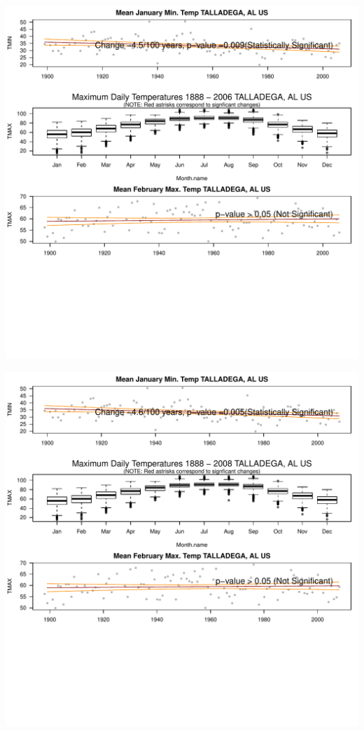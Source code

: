 \documentclass{article}\usepackage[]{graphicx}\usepackage[]{color}
\makeatletter
\def\maxwidth{ %
  \ifdim\Gin@nat@width>\linewidth
    \linewidth
  \else
    \Gin@nat@width
  \fi
}
\newenvironment{knitrout}{}{} %
\makeatother
\begin{document}
\begin{knitrout}
\includegraphics[width=\maxwidth]{figure/static_template-49} 

\includegraphics[width=\maxwidth]{figure/static_template-50} 


\end{knitrout}
\end{document}
